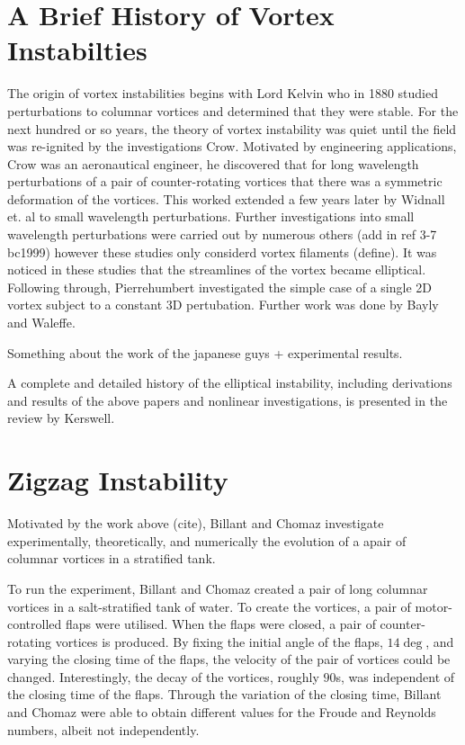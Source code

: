 \section{A Brief History of Vortex Instabilties}
The origin of vortex instabilities begins with Lord Kelvin who in 1880 studied perturbations to columnar vortices and determined that they were stable. For the next hundred or so years, the theory of vortex instability was quiet until the field was re-ignited by the investigations Crow\cite{crow1970}. Motivated by engineering applications, Crow was an aeronautical engineer, he discovered that for long wavelength perturbations of a pair of counter-rotating vortices that there was a symmetric deformation of the vortices. This worked extended a few years later by Widnall et. al \cite{widnall1974} to small wavelength perturbations. Further investigations into small wavelength perturbations were carried out by numerous others\cite{moore1975,tsai1976} (add in ref 3-7 bc1999) however these studies only considerd vortex filaments (define). It was noticed in these studies that the streamlines of the vortex became elliptical. Following through, Pierrehumbert\cite{pierrehumbert1986} investigated the simple case of a single 2D vortex subject to a constant 3D pertubation. Further work was done by Bayly \cite{bayly1986} and Waleffe\cite{waleffe1990}.

Something about the work of the japanese guys + experimental results. 

A complete and detailed history of the elliptical instability, including derivations and results of the above papers and nonlinear investigations, is presented in the review by Kerswell\cite{kerswell2002}.
\section{Zigzag Instability}
Motivated by the work above (cite), Billant and Chomaz investigate experimentally\cite{bc2000a}, theoretically\cite{bc2000b}, and numerically \cite{bc2000c} the evolution of a apair of columnar vortices in a stratified tank.

To run the experiment, Billant and Chomaz created a pair of long columnar vortices in a salt-stratified tank of water. To create the vortices, a pair of motor-controlled flaps were utilised. When the flaps were closed, a pair of counter-rotating vortices is produced. By fixing the initial angle of the flaps, $14\deg$, and varying the closing time of the flaps, the velocity of the pair of vortices could be changed. Interestingly, the decay of the vortices, roughly $90$s, was independent of the closing time of the flaps. Through the variation of the closing time, Billant and Chomaz were able to obtain different values for the Froude and Reynolds numbers, albeit not independently. 
